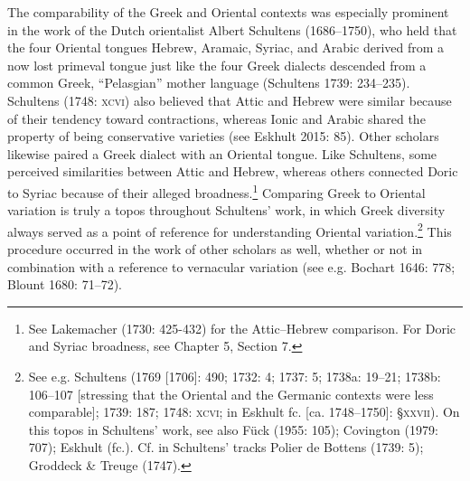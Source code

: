\begin{styleStandard}
The comparability of the Greek and Oriental contexts was especially prominent in the work of the Dutch orientalist Albert Schultens (1686–1750), who held that the four Oriental tongues Hebrew, Aramaic, Syriac, and Arabic derived from a now lost primeval tongue just like the four Greek dialects descended from a common Greek, “Pelasgian” mother language (Schultens 1739: 234–235). Schultens (1748: \textsc{xcvi)} also believed that Attic and Hebrew were similar because of their tendency toward contractions, whereas Ionic and Arabic shared the property of being conservative varieties (see Eskhult 2015: 85). Other scholars likewise paired a Greek dialect with an Oriental tongue. Like Schultens, some perceived similarities between Attic and Hebrew, whereas others connected Doric to Syriac because of their alleged broadness.\footnote{ See Lakemacher (1730: 425-432) for the Attic–Hebrew comparison. For Doric and Syriac broadness, see Chapter 5, Section 7.} Comparing Greek to Oriental variation is truly a topos throughout Schultens’ work, in which Greek diversity always served as a point of reference for understanding Oriental variation.\footnote{ See e.g. Schultens (1769 [1706]: 490; 1732: 4; 1737: 5; 1738a: 19–21; 1738b: 106–107 [stressing that the Oriental and the Germanic contexts were less comparable]; 1739: 187; 1748: \textsc{xcvi}; in Eskhult fc. [ca. 1748–1750]: §\textsc{xxvii}). On this topos in Schultens’ work, see also Fück (1955: 105); Covington (1979: 707); Eskhult (fc.). Cf. in Schultens’ tracks Polier de Bottens (1739: 5); Groddeck \& Treuge (1747).} This procedure occurred in the work of other scholars as well, whether or not in combination with a reference to vernacular variation (see e.g. Bochart 1646: 778; Blount 1680: 71–72).
\end{styleStandard}

